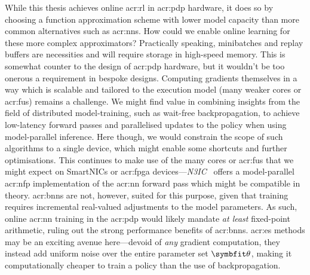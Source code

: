 While this thesis achieves online \gls{acr:rl} in \gls{acr:pdp} hardware, it does so by choosing a function approximation scheme with lower model capacity than more common alternatives such as \glspl{acr:nn}.
How could we enable online learning for these more complex approximators?
Practically speaking, minibatches and replay buffers are necessities and will require storage in high-speed memory.
This is somewhat counter to the design of \gls{acr:pdp} hardware, but it wouldn't be too onerous a requirement in bespoke designs.
Computing gradients themselves in a way which is scalable and tailored to the execution model (many weaker cores or \glspl{acr:fu}) remains a challenge.
We might find value in combining insights from the field of distributed model-training, such as wait-free backpropagation, to achieve low-latency forward passes and parallelised updates to the policy when using model-parallel inference.
Here though, we would constrain the scope of such algorithms to a single device, which might enable some shortcuts and further optimisations.
This continues to make use of the many cores or \glspl{acr:fu} that we might expect on SmartNICs or \gls{acr:fpga} devices---\emph{N3IC}~\parencite{DBLP:journals/corr/abs-2009-02353} offers a model-parallel \gls{acr:nfp} implementation of the \gls{acr:nn} forward pass which might be compatible in theory.
\glspl{acr:bnn} are not, however, suited for this purpose, given that training requires incremental real-valued adjustments to the model parameters.
As such, online \gls{acr:nn} training in the \gls{acr:pdp} would likely mandate \emph{at least} fixed-point arithmetic, ruling out the strong performance benefits of \glspl{acr:bnn}.
\gls{acr:es} methods may be an exciting avenue here---devoid of \emph{any} gradient computation, they instead add uniform noise over the entire parameter set $\wvec{}$, making it computationally cheaper to train a policy than the use of backpropagation.


